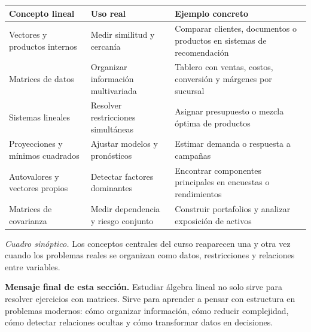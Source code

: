 \documentclass[10pt,a4paper,oneside]{article}
\theoremstyle{plain}
\theoremstyle{definition}
\theoremstyle{remark}
\begin{document}
\begin{center}
\renewcommand{\arraystretch}{1.35}
\begin{tabular}{>{\raggedright\arraybackslash}p{} >{\raggedright\arraybackslash}p{} >{\raggedright\arraybackslash}p{}}
\toprule
\textbf{Concepto lineal} & \textbf{Uso real} & \textbf{Ejemplo concreto} \\
\midrule
Vectores y productos internos & Medir similitud y cercanía & Comparar clientes, documentos o productos en sistemas de recomendación \\
Matrices de datos & Organizar información multivariada & Tablero con ventas, costos, conversión y márgenes por sucursal \\
Sistemas lineales & Resolver restricciones simultáneas & Asignar presupuesto o mezcla óptima de productos \\
Proyecciones y mínimos cuadrados & Ajustar modelos y pronósticos & Estimar demanda o respuesta a campañas \\
Autovalores y vectores propios & Detectar factores dominantes & Encontrar componentes principales en encuestas o rendimientos \\
Matrices de covarianza & Medir dependencia y riesgo conjunto & Construir portafolios y analizar exposición de activos \\
\bottomrule
\end{tabular}
\par\vspace{0.55em}
{\small\emph{Cuadro sinóptico.} Los conceptos centrales del curso reaparecen una y otra vez cuando los problemas reales se organizan como datos, restricciones y relaciones entre variables.}
\end{center}

\begin{summaryBox}
\textbf{Mensaje final de esta sección.} Estudiar álgebra lineal no solo sirve para resolver ejercicios con matrices. Sirve para aprender a pensar con estructura en problemas modernos: cómo organizar información, cómo reducir complejidad, cómo detectar relaciones ocultas y cómo transformar datos en decisiones.
\end{summaryBox}
\end{document}
